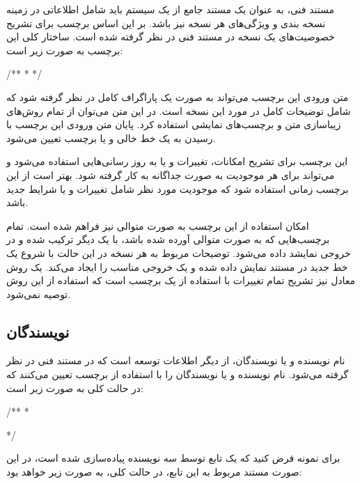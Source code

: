 مستند فنی، به عنوان یک مستند جامع از یک سیستم باید شامل اطلاعاتی در زمینه نسخه
بندی و ویژگی‌های هر نسخه نیز باشد.
بر این اساس برچسب  برای تشریح خصوصیت‌های یک نسخه در مستند فنی در نظر
گرفته شده است.
ساختار کلی این برچسب به صورت زیر است:
\begin{C++}
/**
 * 
 */
\end{C++}

متن ورودی این برچسب می‌تواند به صورت یک پاراگراف کامل در نظر گرفته شود که شامل
توضیحات کامل در مورد این نسخه است.
در این متن می‌توان از تمام روش‌های زیباسازی متن و برچسب‌های نمایشی استفاده کرد.
پایان متن ورودی این برچسب با رسیدن به یک خط خالی و یا برچسب تعیین می‌شود.

\begin{note}
این برچسب برای تشریح امکانات، تغییرات و یا به روز رسانی‌هایی استفاده می‌شود و
می‌تواند برای هر موجودیت به صورت جداگانه به کار گرفته شود.
بهتر است از این برچسب زمانی استفاده شود که موجودیت مورد نظر شامل تغییرات و یا
شرایط جدید باشد.
\end{note}

امکان استفاده از این برچسب به صورت متوالی نیز فراهم شده است.
تمام برچسب‌هایی که به صورت متوالی آورده شده باشد، با یک دیگر ترکیب شده و در
خروجی نمایشد داده می‌شود.
توضیحات مربوط به هر نسخه در این حالت با شروع یک خط جدید در مستند نمایش داده شده
و یک خروجی مناسب را ایجاد می‌کند.
یک روش معادل نیز تشریح تمام تغییرات با استفاده از یک برچسب است که استفاده از این
روش توصیه نمی‌شود.


\subsection{نویسندگان}

نام نویسنده و یا نویسندگان، از دیگر اطلاعات توسعه است که در مستند فنی در نظر
گرفته می‌شود.
نام نویسنده و یا نویسندگان را با استفاده از برچسب  تعیین می‌کنند که
در حالت کلی به صورت زیر است:
\begin{C++}
/**
 * \author {list of autohrs}
 */
\end{C++}

برای نمونه فرض کنید که یک تابع توسط سه نویسنده پیاده‌سازی شده است، در این صورت
مستند مربوط به این تابع، در حالت کلی، به صورت زیر خواهد بود:

